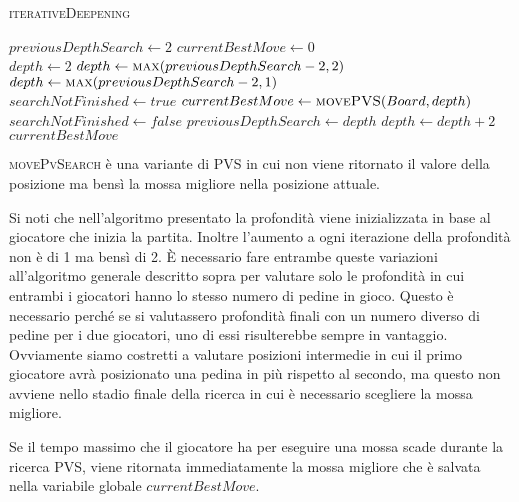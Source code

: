 \documentclass[a4paper]{article}
\begin{document}
\begin{algorithm}
  \caption{\textsc{iterativeDeepening}}
  \label{alg_iterativeDeepening}
  \begin{algorithmic}
    \State $previousDepthSearch \gets 2$
    \State $currentBestMove \gets 0$
    \\
      \State $depth \gets 2$
        \State $depth \gets \Call{max}{previousDepthSearch - 2, 2}$
      \Else
        \State $depth \gets \Call{max}{previousDepthSearch - 2, 1}$ 
      \EndIf
      \\
      \State $searchNotFinished \gets true$
        \State $currentBestMove \gets \Call{movePVS}{Board, depth}$
          \State $searchNotFinished \gets false$
        \EndIf
        \State $previousDepthSearch \gets depth$
        \State $depth \gets depth + 2$
      \EndWhile
      \State \Return $currentBestMove$
    \EndFunction
  \end{algorithmic}
\end{algorithm}

\textsc{movePvSearch} è una variante di PVS in cui non viene ritornato il 
valore della posizione ma bensì la mossa migliore nella posizione attuale.

Si noti che nell'algoritmo presentato la profondità viene inizializzata in base 
al giocatore che inizia la partita. Inoltre l'aumento a ogni iterazione della 
profondità non è di 1 ma bensì di 2. È necessario fare entrambe queste 
variazioni all'algoritmo generale descritto sopra per valutare solo le 
profondità in cui entrambi i giocatori hanno lo stesso numero di pedine in 
gioco. Questo è necessario perché se si valutassero profondità finali con un 
numero diverso di pedine per i due giocatori, uno di essi risulterebbe sempre in 
vantaggio. Ovviamente siamo costretti a valutare posizioni intermedie in cui il
primo giocatore avrà posizionato una pedina in più rispetto al secondo, ma 
questo non avviene nello stadio finale della ricerca in cui è necessario 
scegliere la mossa migliore.

Se il tempo massimo che il giocatore ha per eseguire una mossa scade durante
la ricerca PVS, viene ritornata immediatamente la mossa migliore che è salvata
nella variabile globale $currentBestMove$.
\end{document}
